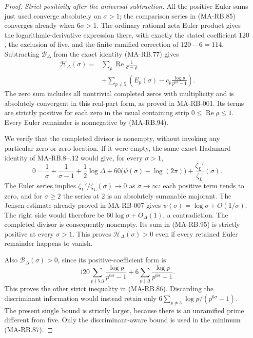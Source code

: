 \begin{proof}
\emph{Strict positivity after the universal subtraction.}
All the positive Euler sums just used converge
absolutely on \(\sigma>1\); the comparison series
in (MA-RB.85) converges already when \(6\sigma>1\).
The ordinary rational zeta Euler product gives
the logarithmic-derivative expression there, with
exactly the stated coefficient \(120\), the
exclusion of five, and the finite ramified correction
of \(120-6=114\).
Subtracting \(\mathcal B_\Delta\) from the exact identity
(MA-RB.77) gives
\[
 \begin{split}
 \mathcal H_\Delta(\sigma)
   ={}&\sum_\rho\operatorname{Re}\frac1{\sigma-\rho}\\
      &+\sum_{p\ne5}
          \left(E_p(\sigma)
                  -c_p\frac{\log p}{p^{6\sigma}-1}\right).
 \end{split}
 \tag{MA-RB.95}
\]
The zero sum includes all nontrivial completed
zeros with multiplicity and is absolutely convergent
in this real-part form, as proved in MA-RB-001.
Its terms are strictly positive for each zero in
the usual containing strip
\(0\le\operatorname{Re}\rho\le1\).
Every Euler remainder is nonnegative by
(MA-RB.94).

We verify that the completed divisor is nonempty,
without invoking any particular zero or zero location.
If it were empty, the same exact Hadamard identity
of MA-RB.8--.12 would give, for every \(\sigma>1\),
\[
 0=\frac1\sigma+\frac1{\sigma-1}
       +\frac12\log\Delta
       +60\bigl(\psi(\sigma)-\log(2\pi)\bigr)
       +\frac{\zeta_L'}{\zeta_L}(\sigma).
\]
The Euler series implies
\(\zeta_L'/\zeta_L(\sigma)\to0\) as \(\sigma\to\infty\):
each positive term tends to zero, and for
\(\sigma\ge2\) the series at \(2\) is an absolutely
summable majorant. The Jensen estimate already proved
in MA-RB-007 gives
\(\psi(\sigma)=\log\sigma+O(1/\sigma)\).
The right side would therefore be
\(60\log\sigma+O_\Delta(1)\), a contradiction.
The completed divisor is consequently nonempty.
Its sum in (MA-RB.95) is strictly positive at every
\(\sigma>1\). This proves
\(\mathcal H_\Delta(\sigma)>0\) even if every retained
Euler remainder happens to vanish.

Also \(\mathcal B_\Delta(\sigma)>0\), since its
positive-coefficient form is
\[
 120\sum_{p\nmid5\Delta}\frac{\log p}{p^{6\sigma}-1}
       +6\sum_{p\mid\Delta}\frac{\log p}{p^{6\sigma}-1}.
\]
This proves the other strict inequality in (MA-RB.86).
Discarding the discriminant information would instead
retain only \(6\sum_{p\ne5}\log p/(p^{6\sigma}-1)\).
The present single bound is strictly larger, because
there is an unramified prime different from five.
Only the discriminant-aware bound is used in the
minimum (MA-RB.87).


\end{proof}
